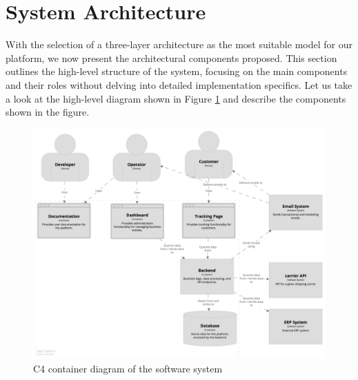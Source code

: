 



   
   


\section{System Architecture}
With the selection of a three-layer architecture as the most suitable model for our platform, we now present the architectural components proposed. 
This section outlines the high-level structure of the system, focusing on the main components and their roles without delving into detailed implementation specifics.
Let us take a look at the high-level diagram shown in Figure \ref{img03:c4_container_diagram_software_sytem} and describe the components shown in the figure.

\begin{figure}[H]\centering
\includegraphics[width=140mm]{img/chap03/fig_architecture.png}
\caption{C4 container diagram of the software system}
\label{img03:c4_container_diagram_software_sytem}
\end{figure}

